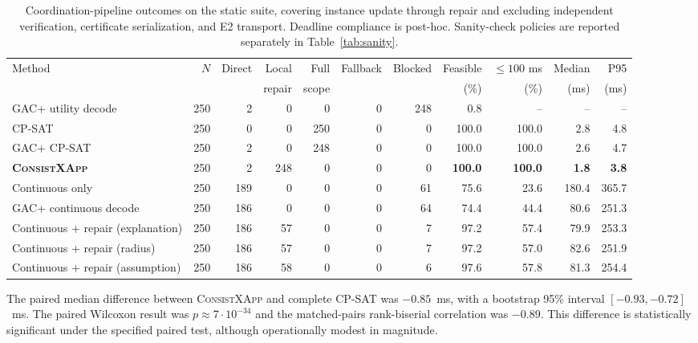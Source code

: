 \documentclass[pdflatex,sn-mathphys-num,iicol,oneside]{sn-jnl}
\newcommand{\method}{\textsc{ConsistXApp}\xspace}
\newcommand{\gac}{\textsc{GAC}\xspace}
\newcommand{\cpsat}{\textsc{CP-SAT}\xspace}
\begin{document}
\begin{table}[t]
\centering
\caption{
Coordination-pipeline outcomes on the static suite, covering instance
update through repair and excluding independent verification,
certificate serialization, and E2 transport. Deadline compliance is
post-hoc. Sanity-check policies are reported separately in
Table~\ref{tab:sanity}.
}
\label{tab:main-results}
\setlength{\tabcolsep}{3pt}
\footnotesize

\begin{tabular}{lrrrrrrrrrr}
\toprule
Method &
$N$ &
Direct &
Local &
Full &
Fallback &
Blocked &
Feasible &
$\leq100$ ms &
Median &
P95\\
&
&
&
repair &
scope &
&
&
(\%) &
(\%) &
(ms) &
(ms)\\
\midrule


\gac + utility decode
& 250 & 2 & 0 & 0 & 0 & 248 & 0.8 & -- & -- & --\\

\cpsat
& 250 & 0 & 0 & 250 & 0 & 0 & 100.0 & 100.0 & 2.8 & 4.8\\

\gac + \cpsat
& 250 & 2 & 0 & 248 & 0 & 0 & 100.0 & 100.0 & 2.6 & 4.7\\

\textbf{\method}
& 250 & 2 & 248 & 0 & 0 & 0 &
\textbf{100.0} &
\textbf{100.0} &
\textbf{1.8} &
\textbf{3.8}\\

\midrule

Continuous only
& 250 & 189 & 0 & 0 & 0 & 61 & 75.6 & 23.6 & 180.4 & 365.7\\

\gac + continuous decode
& 250 & 186 & 0 & 0 & 0 & 64 & 74.4 & 44.4 & 80.6 & 251.3\\

Continuous + repair (explanation)
& 250 & 186 & 57 & 0 & 0 & 7 & 97.2 & 57.4 & 79.9 & 253.3\\

Continuous + repair (radius)
& 250 & 186 & 57 & 0 & 0 & 7 & 97.2 & 57.0 & 82.6 & 251.9\\

Continuous + repair (assumption)
& 250 & 186 & 58 & 0 & 0 & 6 & 97.6 & 57.8 & 81.3 & 254.4\\

\bottomrule
\end{tabular}
\normalsize
\end{table}

The paired median difference between \method and complete \cpsat was
$-0.85$~ms, with a bootstrap 95\% interval
$[-0.93,-0.72]$~ms. The paired Wilcoxon result was
$p\approx 7\cdot 10^{-34}$ and the matched-pairs rank-biserial correlation was $-0.89$.
This difference is statistically significant under the specified paired test, although operationally modest in magnitude.
\end{document}
